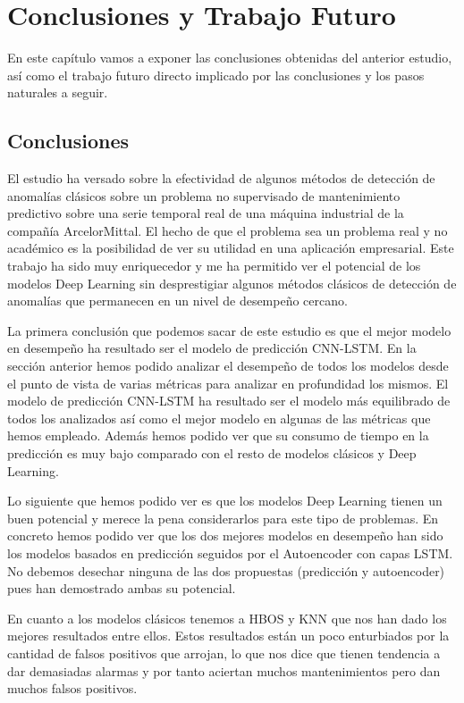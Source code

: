 \chapter{Conclusiones y Trabajo Futuro}
\label{chapter:conclusiones-trabajo-futuro}

En este capítulo vamos a exponer las conclusiones obtenidas del anterior estudio, así como el trabajo futuro directo implicado por las conclusiones y los pasos naturales a seguir.

\section{Conclusiones}

El estudio ha versado sobre la efectividad de algunos métodos de detección de anomalías clásicos sobre un problema no supervisado de mantenimiento predictivo sobre una serie temporal real de una máquina industrial de la compañía ArcelorMittal. El hecho de que el problema sea un problema real y no académico es la posibilidad de ver su utilidad en una aplicación empresarial. Este trabajo ha sido muy enriquecedor y me ha permitido ver el potencial de los modelos Deep Learning sin desprestigiar algunos métodos clásicos de detección de anomalías que permanecen en un nivel de desempeño cercano.

La primera conclusión que podemos sacar de este estudio es que el mejor modelo en desempeño ha resultado ser el modelo de predicción CNN-LSTM. En la sección anterior hemos podido analizar el desempeño de todos los modelos desde el punto de vista de varias métricas para analizar en profundidad los mismos. El modelo de predicción CNN-LSTM ha resultado ser el modelo más equilibrado de todos los analizados así como el mejor modelo en algunas de las métricas que hemos empleado. Además hemos podido ver que su consumo de tiempo en la predicción es muy bajo comparado con el resto de modelos clásicos y Deep Learning.

Lo siguiente que hemos podido ver es que los modelos Deep Learning tienen un buen potencial y merece la pena considerarlos para este tipo de problemas. En concreto hemos podido ver que los dos mejores modelos en desempeño han sido los modelos basados en predicción seguidos por el Autoencoder con capas LSTM. No debemos desechar ninguna de las dos propuestas (predicción y autoencoder) pues han demostrado ambas su potencial.

En cuanto a los modelos clásicos tenemos a HBOS y KNN que nos han dado los mejores resultados entre ellos. Estos resultados están un poco enturbiados por la cantidad de falsos positivos que arrojan, lo que nos dice que tienen tendencia a dar demasiadas alarmas y por tanto aciertan muchos mantenimientos pero dan muchos falsos positivos.


